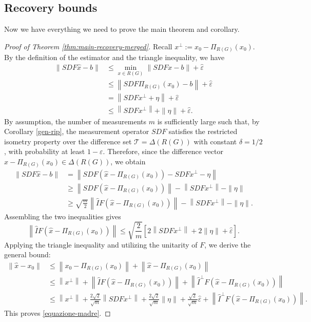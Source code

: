\documentclass[a4paper,oneside]{amsart}
\begin{document}
\subsection{Recovery bounds}
Now we have everything we need to prove the main theorem and corollary.
\begin{proof}[Proof of Theorem \ref{thm:main-recovery-merged}]
    Recall $x^{\perp} := x_0 - \Pi_{R(G)}(x_0)$. By the definition of the estimator and the triangle inequality, we have
    $$
    \begin{aligned}
        \|SDF \hat{x} - b\| & \leq \min _{x \in R(G)}\|SDF x - b\| + \hat{\varepsilon} \\
        & \leq \left\|SDF \Pi_{R(G)}(x_0) - b\right\| + \hat{\varepsilon} \\
        & = \left\|SDF x^{\perp} + \eta\right\| + \hat{\varepsilon} \\
        & \leq \left\|SDF x^{\perp}\right\| + \|\eta\| + \hat{\varepsilon}.
    \end{aligned}
    $$
    By assumption, the number of measurements $m$ is sufficiently large such that, by Corollary \ref{gen-rip}, the measurement operator $SDF$ satisfies the restricted isometry property over the difference set $\mathcal{T} = \Delta(R(G))$ with constant $\delta = 1/2$, with probability at least $1-\varepsilon$. Therefore, since the difference vector $\hat{x} - \Pi_{R(G)}(x_0) \in \Delta(R(G))$, we obtain
    $$
    \begin{aligned}
        \|SDF \hat{x} - b\| & = \left\|SDF\left(\hat{x} - \Pi_{R(G)}(x_0)\right) - SDF x^{\perp} - \eta\right\| \\
        & \geq \left\|SDF\left(\hat{x} - \Pi_{R(G)}(x_0)\right)\right\| - \left\|SDF x^{\perp}\right\| - \|\eta\| \\
        & \geq \sqrt{\frac{m}{2}}\left\|\hat{I}F \left(\hat{x} - \Pi_{R(G)}(x_0)\right)\right\| - \left\|SDF x^{\perp}\right\| - \|\eta\|.
    \end{aligned}
    $$
    Assembling the two inequalities gives
    $$
    \left\|\hat{I}F\left(\hat{x} - \Pi_{R(G)}(x_0)\right)\right\| \leq \sqrt{\frac{2}{m}}\left[2\left\|SDF x^{\perp}\right\| + 2\|\eta\| + \hat{\varepsilon}\right].
    $$
    Applying the triangle inequality and utilizing the unitarity of $F$, we derive the general bound:
    $$
    \begin{aligned}
        \left\|\hat{x} - x_0\right\| & \leq \left\|x_0 - \Pi_{R(G)}(x_0)\right\| + \left\|\hat{x} - \Pi_{R(G)}(x_0)\right\| \\
        & \leq \left\|x^{\perp}\right\| + \left\|\hat{I}F(\hat{x} - \Pi_{R(G)}(x_0))\right\| + \left\|\hat{I}^\perp F(\hat{x} - \Pi_{R(G)}(x_0))\right\| \\
        & \leq \left\|x^{\perp}\right\| + \frac{2\sqrt{2}}{\sqrt{m}}\left\|SDF x^{\perp}\right\| + \frac{2\sqrt{2}}{\sqrt{m}}\|\eta\| + \frac{\sqrt{2}}{\sqrt{m}}\hat{\varepsilon} + \left\|\hat{I}^\perp F(\hat{x} - \Pi_{R(G)}(x_0))\right\|.
    \end{aligned}
    $$
    This proves \eqref{equazione-madre}.
    

\end{proof}
\end{document}
